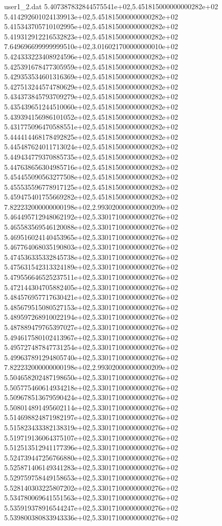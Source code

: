 \begin{filecontents}{user1_2.dat}
5.407387832844575541e+02,5.451815000000000282e+02
5.414292601024139913e+02,5.451815000000000282e+02
5.415343705710102995e+02,5.451815000000000282e+02
5.419312912216532823e+02,5.451815000000000282e+02
7.649696699999999510e+02,3.016021700000000010e+02
5.424333223408924596e+02,5.451815000000000282e+02
5.425391678477305959e+02,5.451815000000000282e+02
5.429353534601316369e+02,5.451815000000000282e+02
5.427513244574780629e+02,5.451815000000000282e+02
5.434373845793709279e+02,5.451815000000000282e+02
5.435439651244510060e+02,5.451815000000000282e+02
5.439394156986101052e+02,5.451815000000000282e+02
5.431775096470588551e+02,5.451815000000000282e+02
5.444414468178492825e+02,5.451815000000000282e+02
5.445487624011713024e+02,5.451815000000000282e+02
5.449434779370885735e+02,5.451815000000000282e+02
5.447638656304985716e+02,5.451815000000000282e+02
5.454455090563277508e+02,5.451815000000000282e+02
5.455535596778917125e+02,5.451815000000000282e+02
5.459475401755669282e+02,5.451815000000000282e+02
7.822232000000000198e+02,2.993020000000000209e+02
5.464495712948062192e+02,5.330171000000000276e+02
5.465583569546120088e+02,5.330171000000000276e+02
5.469516024140453965e+02,5.330171000000000276e+02
5.467764068035190803e+02,5.330171000000000276e+02
5.474536335332845738e+02,5.330171000000000276e+02
5.475631542313324189e+02,5.330171000000000276e+02
5.479556646525237511e+02,5.330171000000000276e+02
5.472144304705882405e+02,5.330171000000000276e+02
5.484576957717630421e+02,5.330171000000000276e+02
5.485679515080527153e+02,5.330171000000000276e+02
5.489597268910022194e+02,5.330171000000000276e+02
5.487889479765397027e+02,5.330171000000000276e+02
5.494617580102413967e+02,5.330171000000000276e+02
5.495727487847731254e+02,5.330171000000000276e+02
5.499637891294805740e+02,5.330171000000000276e+02
7.822232000000000198e+02,2.993020000000000209e+02
5.504658202487198650e+02,5.330171000000000276e+02
5.505775460614934218e+02,5.330171000000000276e+02
5.509678513679590424e+02,5.330171000000000276e+02
5.508014891495602114e+02,5.330171000000000276e+02
5.514698824871982197e+02,5.330171000000000276e+02
5.515823433382138319e+02,5.330171000000000276e+02
5.519719136064375107e+02,5.330171000000000276e+02
5.512513512941177396e+02,5.330171000000000276e+02
5.524739447256766880e+02,5.330171000000000276e+02
5.525871406149341283e+02,5.330171000000000276e+02
5.529759758449158653e+02,5.330171000000000276e+02
5.528140303225807202e+02,5.330171000000000276e+02
5.534780069641551563e+02,5.330171000000000276e+02
5.535919378916544247e+02,5.330171000000000276e+02
5.539800380833943336e+02,5.330171000000000276e+02

\end{filecontents}
